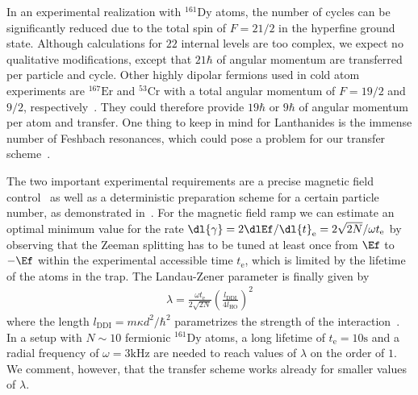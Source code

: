 In an experimental realization with $^{161}\text{Dy}$ atoms, the number of cycles can be significantly reduced due to the total spin of $F=21/2$ in the hyperfine ground state. Although calculations for $22$ internal levels are too complex, we expect no qualitative modifications, except that $21\hbar$ of angular momentum are transferred per particle and cycle. Other highly dipolar fermions used in cold atom experiments are $^{167}\text{Er}$ and $^{53}\text{Cr}$ with a total angular momentum of $F=19/2$ and $9/2$, respectively~\cite{Berglund2007,Chicireanu2006}. They could therefore provide $19\hbar$ or $9\hbar$ of angular momentum per atom and transfer. One thing to keep in mind for Lanthanides is the immense number of Feshbach resonances, which could pose a problem for our transfer scheme~\cite{Frisch2014,Maier2015}.

The two important experimental requirements are a precise magnetic field control~\cite{Pasquiou2011} as well as a deterministic preparation scheme for a certain particle number, as demonstrated in~\cite{Serwane2011}. For the magnetic field ramp we can estimate an optimal minimum value for the rate $\dl{\gamma}=2\dlEf/\dl{t}_\text{e}=2\sqrt{2N}/\omega t_\text{e}$ by observing that the Zeeman splitting has to be tuned at least once from $\Ef$ to $-\Ef$ within the experimental accessible time $t_\text{e}$, which is limited by the lifetime of the atoms in the trap. The Landau-Zener parameter is finally given by
\begin{align}
\lambda = \frac{\omega t_\text{e}}{2\sqrt{2N}} \left(\frac{l_\text{DDI}}{4 l_\text{HO}}\right)^2
\end{align}
where the length $l_\text{DDI} = m\kappa d^2/\hbar^2$ parametrizes the strength of the interaction~\cite{Lu2012}. In a setup with $N\sim 10$ fermionic $^{161}\text{Dy}$ atoms, a long lifetime of $t_\text{e}=10\text{s}$ and a radial frequency of $\omega = 3\text{kHz}$ are needed to reach values of $\lambda$ on the order of $1$. We comment, however, that the transfer scheme works already for smaller values of $\lambda$.


